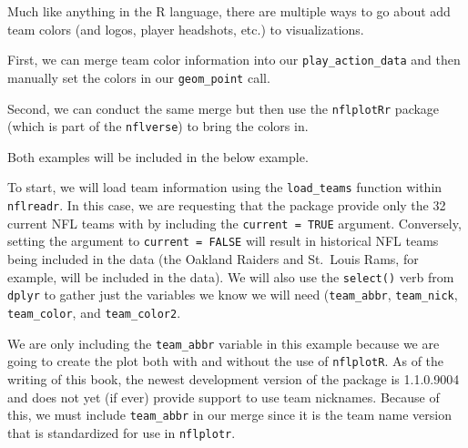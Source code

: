 \documentclass[
  letterpaper,
]{krantz}
\begin{document}
\begin{tcolorbox}[enhanced jigsaw, left=2mm, toprule=.15mm, opacitybacktitle=0.6, leftrule=.75mm, bottomrule=.15mm, colbacktitle=quarto-callout-note-color!10!white, breakable, colback=white, bottomtitle=1mm, toptitle=1mm, title=\textcolor{quarto-callout-note-color}{\faInfo}\hspace{0.5em}{Note}, coltitle=black, titlerule=0mm, arc=.35mm, opacityback=0, colframe=quarto-callout-note-color-frame, rightrule=.15mm]

Much like anything in the R language, there are multiple ways to go
about add team colors (and logos, player headshots, etc.) to
visualizations.

First, we can merge team color information into our
\texttt{play\_action\_data} and then manually set the colors in our
\texttt{geom\_point} call.

Second, we can conduct the same merge but then use the
\texttt{nflplotRr} package (which is part of the \texttt{nflverse}) to
bring the colors in.

Both examples will be included in the below example.

\end{tcolorbox}

To start, we will load team information using the \texttt{load\_teams}
function within \texttt{nflreadr}. In this case, we are requesting that
the package provide only the 32 current NFL teams with by including the
\texttt{current\ =\ TRUE} argument. Conversely, setting the argument to
\texttt{current\ =\ FALSE} will result in historical NFL teams being
included in the data (the Oakland Raiders and St.~Louis Rams, for
example, will be included in the data). We will also use the
\texttt{select()} verb from \texttt{dplyr} to gather just the variables
we know we will need (\texttt{team\_abbr}, \texttt{team\_nick},
\texttt{team\_color}, and \texttt{team\_color2}.

\begin{tcolorbox}[enhanced jigsaw, left=2mm, toprule=.15mm, opacitybacktitle=0.6, leftrule=.75mm, bottomrule=.15mm, colbacktitle=quarto-callout-important-color!10!white, breakable, colback=white, bottomtitle=1mm, toptitle=1mm, title=\textcolor{quarto-callout-important-color}{\faExclamation}\hspace{0.5em}{Important}, coltitle=black, titlerule=0mm, arc=.35mm, opacityback=0, colframe=quarto-callout-important-color-frame, rightrule=.15mm]

We are only including the \texttt{team\_abbr} variable in this example
because we are going to create the plot both with and without the use of
\texttt{nflplotR}. As of the writing of this book, the newest
development version of the package is 1.1.0.9004 and does not yet (if
ever) provide support to use team nicknames. Because of this, we must
include \texttt{team\_abbr} in our merge since it is the team name
version that is standardized for use in \texttt{nflplotr}.

\end{tcolorbox}
\end{document}
